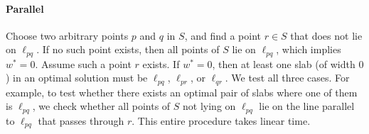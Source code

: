 \paragraph*{Parallel}
Choose two arbitrary points $p$ and $q$ in $S$, and find a point $r \in S$ that does not lie on $\ell_{pq}$. 
If no such point exists, then all points of $S$ lie on $\ell_{pq}$, which implies $w^* = 0$.
Assume such a point $r$ exists. 
If $w^* = 0$, then at least one slab (of width $0$) in an optimal solution must be $\ell_{pq}$, $\ell_{pr}$, or $\ell_{qr}$.
We test all three cases. 
For example, to test whether there exists an optimal pair of slabs where one of them is $\ell_{pq}$, we check whether all points of $S$ not lying on $\ell_{pq}$ lie on the line parallel to $\ell_{pq}$ that passes through $r$. 
This entire procedure takes linear time.








